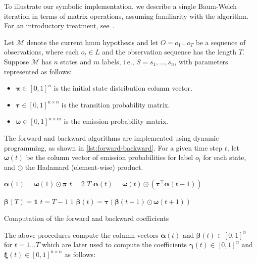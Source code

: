 To illustrate our symbolic implementation, we describe a single Baum-Welch iteration in terms of matrix operations, assuming familiarity with the algorithm. For an introductory treatment, see~\cite{Baum70,reynouard2024learning}.

Let $\mathcal{M}$ denote the current \gls{hmm} hypothesis and let $O = o_1 \dots o_T$ be a sequence of observations, where each $o_t \in L$ and the observation sequence has the length $T$. Suppose $\mathcal{M}$ has $n$ states and $m$ labels, i.e., $S = {s_1, \dots, s_n}$, with parameters represented as follows:


\begin{itemize}
    \item $\pmb{\pi} \in [0,1]^{n}$ is the initial state distribution column vector.
    \item $\pmb{\tau} \in [0,1]^{n \times n}$ is the transition probability matrix.
    \item $\pmb{\omega} \in [0,1]^{n \times m}$ is the emission probability matrix.
\end{itemize}


The forward and backward algorithms are implemented using dynamic programming, as shown in \autoref{lst:forward-backward}.
For a given time step $t$, let $\pmb{\omega}(t)$ be the column vector of emission probabilities for label $o_t$ for each state, and $\odot$ the Hadamard (element-wise) product.


\begin{listing}
    \begin{codebox}
        \li $\pmb{\alpha}(1) = \pmb{\omega}(1) \odot \pmb{\pi}$
        \li \For $t = 2$ \To $T$ \Do
        \li $\pmb{\alpha}(t) = \pmb{\omega}(t) \odot \left( \pmb{\tau}^\top \pmb{\alpha}(t-1) \right)$
        \End
    \end{codebox}
    \begin{codebox}
        \li $\pmb{\beta}(T) = \mathbf{1}$
        \li \For $t = T-1$ \To $1$ \Do
        \li $\pmb{\beta}(t) = \pmb{\tau} \left( \pmb{\beta}(t+1) \odot \pmb{\omega}(t+1) \right)$
        \End
    \end{codebox}
    \caption{Computation of the forward and backward coefficients}
    \label{lst:forward-backward}
\end{listing}


The above procedures compute the column vectors $\pmb{\alpha}(t)$ and $\pmb{\beta}(t) \in [0,1]^{n}$ for $t = 1\dots T$ which are later used to compute the coefficients $\pmb{\gamma}(t) \in [0,1]^{n}$ and $\pmb{\xi}(t) \in [0,1]^{n \times n}$ as follows:

